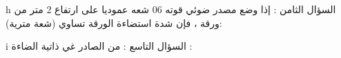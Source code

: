 \documentclass[a4paper]{article}
\begin{document}
\begin{examcopy}
  \begin{arab}\begin{question}{h}
السؤال الثامن : إذا وضع مصدر ضوئي قوته 06 شعه عموديا على ارتفاع 2 متر من ورقة ، فإن شدة استضاءة الورقة تساوي (شعة مترية):
    \begin{choiceshoriz}[o]
    \end{choiceshoriz}
  \end{question}\end{arab}
  

   \begin{arab}\begin{question}{i}
السؤال التاسع : من الصادر غي ذاتية الضاءة :
    \begin{choices}
    \end{choices}
  \end{question}\end{arab}


\end{examcopy}
\end{document}
